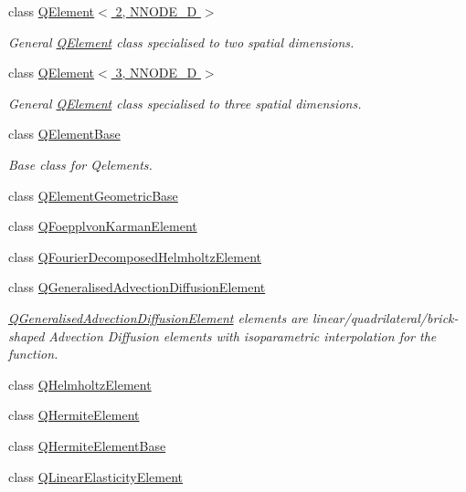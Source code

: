 \begin{DoxyCompactItemize}
class \hyperlink{classoomph_1_1QElement_3_012_00_01NNODE__1D_01_4}{Q\+Element$<$ 2, N\+N\+O\+D\+E\+\_\+D $>$}
\begin{DoxyCompactList}\small\item\em General \hyperlink{classoomph_1_1QElement}{Q\+Element} class specialised to two spatial dimensions. \end{DoxyCompactList}\item 
class \hyperlink{classoomph_1_1QElement_3_013_00_01NNODE__1D_01_4}{Q\+Element$<$ 3, N\+N\+O\+D\+E\+\_\+D $>$}
\begin{DoxyCompactList}\small\item\em General \hyperlink{classoomph_1_1QElement}{Q\+Element} class specialised to three spatial dimensions. \end{DoxyCompactList}\item 
class \hyperlink{classoomph_1_1QElementBase}{Q\+Element\+Base}
\begin{DoxyCompactList}\small\item\em Base class for Qelements. \end{DoxyCompactList}\item 
class \hyperlink{classoomph_1_1QElementGeometricBase}{Q\+Element\+Geometric\+Base}
\item 
class \hyperlink{classoomph_1_1QFoepplvonKarmanElement}{Q\+Foepplvon\+Karman\+Element}
\item 
class \hyperlink{classoomph_1_1QFourierDecomposedHelmholtzElement}{Q\+Fourier\+Decomposed\+Helmholtz\+Element}
\item 
class \hyperlink{classoomph_1_1QGeneralisedAdvectionDiffusionElement}{Q\+Generalised\+Advection\+Diffusion\+Element}
\begin{DoxyCompactList}\small\item\em \hyperlink{classoomph_1_1QGeneralisedAdvectionDiffusionElement}{Q\+Generalised\+Advection\+Diffusion\+Element} elements are linear/quadrilateral/brick-\/shaped Advection Diffusion elements with isoparametric interpolation for the function. \end{DoxyCompactList}\item 
class \hyperlink{classoomph_1_1QHelmholtzElement}{Q\+Helmholtz\+Element}
\item 
class \hyperlink{classoomph_1_1QHermiteElement}{Q\+Hermite\+Element}
\item 
class \hyperlink{classoomph_1_1QHermiteElementBase}{Q\+Hermite\+Element\+Base}
\item 
class \hyperlink{classoomph_1_1QLinearElasticityElement}{Q\+Linear\+Elasticity\+Element}

\end{DoxyCompactItemize}
